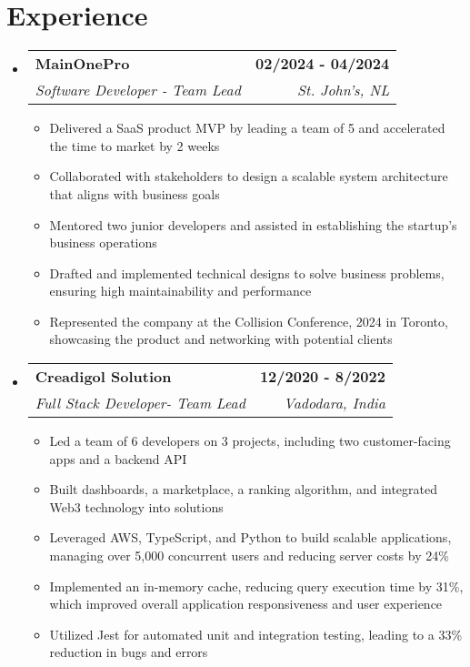\documentclass[letterpaper,11pt]{article}
\makeatletter
\newcommand{\resumeItem}[1]{
  \item\small{
    {#1 \vspace{-2pt}}
  }
}
\newcommand{\resumeSubheading}[4]{
  \vspace{-2pt}\item
    \begin{tabular*}{1.0\textwidth}[t]{l@{\extracolsep{\fill}}r}
      \textbf{#1} & \textbf{\small #2} \\
      \textit{\small#3} & \textit{\small #4} \\
    \end{tabular*}\vspace{-7pt}
}
\newcommand{\resumeSubHeadingListStart}{\begin{itemize}[leftmargin=0.0in, label={}]}
\newcommand{\resumeSubHeadingListEnd}{\end{itemize}}
\newcommand{\resumeItemListStart}{\begin{itemize}}
\newcommand{\resumeItemListEnd}{\end{itemize}\vspace{-5pt}}
\makeatother
\begin{document}
\section{Experience}
  \resumeSubHeadingListStart
    \resumeSubheading
      {MainOnePro}{02/2024 - 04/2024}
      {Software Developer - Team Lead}{St. John's, NL}
      \resumeItemListStart
        \resumeItem{Delivered a SaaS product MVP by leading a team of 5 and accelerated the time to market by 2 weeks}
        \resumeItem{Collaborated with stakeholders to design a scalable system architecture that aligns with business goals}
        \resumeItem{Mentored two junior developers and assisted in establishing the startup's business operations}
        \resumeItem{Drafted and implemented technical designs to solve business problems, ensuring high maintainability and performance}
        \resumeItem{Represented the company at the Collision Conference, 2024 in Toronto, showcasing the product and networking with potential clients}
      \resumeItemListEnd
    \resumeSubheading
      {Creadigol Solution}{12/2020 - 8/2022}
      {Full Stack Developer- Team Lead}{Vadodara, India}
      \resumeItemListStart
        \resumeItem{Led a team of 6 developers on 3 projects, including two customer-facing apps and a backend API}
        \resumeItem{Built dashboards, a marketplace, a ranking algorithm, and integrated Web3 technology into solutions}
        \resumeItem{Leveraged AWS, TypeScript, and Python to build scalable applications, managing over 5,000 concurrent users
        and reducing server costs by 24\%}
        \resumeItem{Implemented an in-memory cache, reducing query execution time by 31\%, which improved overall application
        responsiveness and user experience}
        \resumeItem{Utilized Jest for automated unit and integration testing, leading to a 33\% reduction in bugs and errors}
      \resumeItemListEnd
  \resumeSubHeadingListEnd
\vspace{-16pt}
\end{document}
